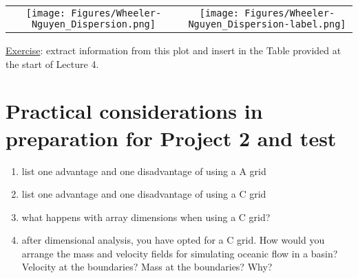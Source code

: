 \begin{center}
	\begin{tabular}{cc}
		\texttt{[image: Figures/Wheeler-Nguyen\_Dispersion.png]} &
		\texttt{[image: Figures/Wheeler-Nguyen\_Dispersion-label.png]}
	\end{tabular}
\end{center}

\underline{Exercise}: extract information from this plot and insert in the Table provided at the start of Lecture 4.

\section{Practical considerations in preparation for Project 2 and test}
\begin{enumerate}
	\item list one advantage and one disadvantage of using a A grid
	\item list one advantage and one disadvantage of using a C grid
	\item what happens with array dimensions when using a C grid?
	\item after dimensional analysis, you have opted for a C grid. How would you arrange the mass and velocity fields for simulating oceanic flow in a basin?
	Velocity at the boundaries? Mass at the boundaries? Why?
\end{enumerate}
